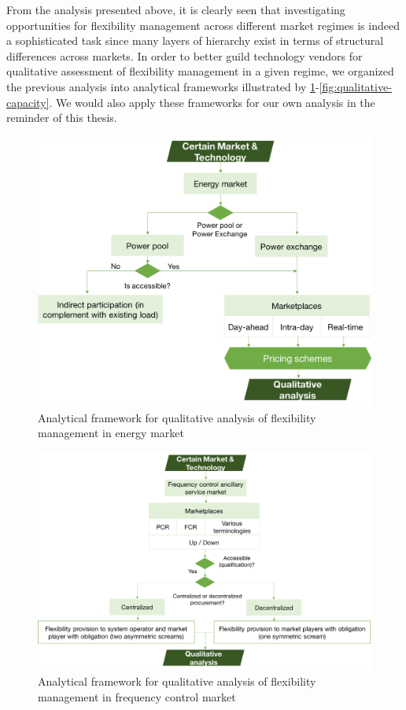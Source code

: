 From the analysis presented above, it is clearly seen that investigating opportunities for flexibility management across different market regimes is indeed a sophisticated task since many layers of hierarchy exist in terms of structural differences across markets. In order to better guild technology vendors for qualitative assessment of flexibility management in a given regime, we organized the previous analysis into analytical frameworks illustrated by \ref{fig:qualitative-energy}-\ref{fig:qualitative-capacity}. We would also apply these frameworks for our own analysis in the reminder of this thesis.

\begin{figure}[h!]
	\centering
	\includegraphics[width=0.95\linewidth]{Figures/Q_energy}
	\caption{Analytical framework for qualitative analysis of flexibility management in energy market}
	\label{fig:qualitative-energy}
\end{figure}

\begin{figure}[h!]
	\centering
	\includegraphics[width=0.95\linewidth]{Figures/Q_frequency_control}
	\caption{Analytical framework for qualitative analysis of flexibility management in frequency control market}
	\label{fig:qualitative-fr}
\end{figure}

